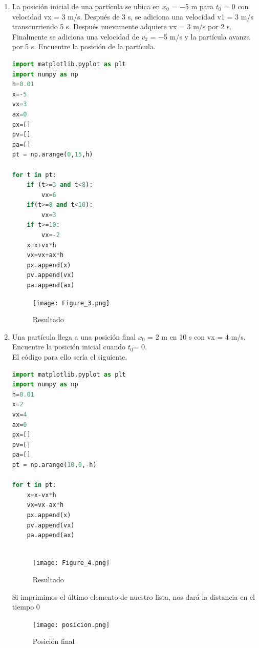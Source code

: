 \documentclass{article}
\begin{document}
\begin{flushleft}
\begin{enumerate}
    
    \item La posición inicial de una partícula se ubica en $x_0$ = −5 m para $t_0$ = 0 con velocidad vx = 3 m/s. Después de 3 s, se adiciona una velocidad v1 = 3 m/s transcurriendo 5 s. Después nuevamente adquiere vx = 3 m/s por 2 s. Finalmente se adiciona una velocidad de $v_2$ = −5 m/s y la partícula avanza por 5 s. Encuentre la posición de la partícula.
    
    \begin{lstlisting}[language=Python,caption=Ejercicio 3]
import matplotlib.pyplot as plt
import numpy as np
h=0.01
x=-5
vx=3
ax=0
px=[]
pv=[]
pa=[]
pt = np.arange(0,15,h)

for t in pt:
    if (t>=3 and t<8):
        vx=6
    if(t>=8 and t<10):
        vx=3
    if t>=10:
        vx=-2
    x=x+vx*h
    vx=vx+ax*h
    px.append(x)
    pv.append(vx)
    pa.append(ax)
     \end{lstlisting}
     
     \begin{figure}[H]
    \centering
    \texttt{[image: Figure\_3.png]}
    \caption{Resultado}
    \end{figure}
    
    \item Una partícula llega a una posición final $x_0$ = 2 m en 10 s con vx = 4 m/s. Encuentre la posición
inicial cuando $t_0$= 0.\\
    El código para ello sería el siguiente.
    \begin{lstlisting}[language=Python,caption=Ejercicio 4]
import matplotlib.pyplot as plt
import numpy as np
h=0.01
x=2
vx=4
ax=0
px=[]
pv=[]
pa=[]
pt = np.arange(10,0,-h)

for t in pt:
    x=x-vx*h
    vx=vx-ax*h
    px.append(x)
    pv.append(vx)
    pa.append(ax)
        
    \end{lstlisting}
    
    \begin{figure}[H]
    \centering
    \texttt{[image: Figure\_4.png]}
    \caption{Resultado}
    \end{figure}
    
    Si imprimimos el último elemento de nuestro lista, nos dará la distancia en el tiempo 0
    
      \begin{figure}[H]
    \centering
    \texttt{[image: posicion.png]}
    \caption{Posición final}
    \end{figure}
    

\end{enumerate}
\end{flushleft}
\end{document}
